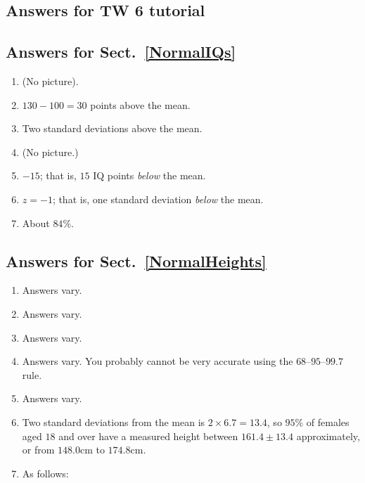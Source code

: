 \documentclass[
  11pt,
  a4paper,
  krantz2]{krantz}
\providecommand{\tightlist}{%
  \setlength{\itemsep}{0pt}\setlength{\parskip}{0pt}}
\begin{document}
\begin{footnotesize}
\section{Answers for TW 6 tutorial}\label{Lecture6Answers}

\subsection*{Answers for Sect.~\ref{NormalIQs}}\label{answers-for-sect.-refnormaliqs}

\begin{enumerate}
\def\labelenumi{\arabic{enumi}.}
\tightlist
\item
  (No picture).
\item
  \(130 - 100 = 30\) points above the mean.
\item
  Two standard deviations above the mean.
\item
  (No picture.)
\item
  \(-15\); that is, \(15\) IQ points \emph{below} the mean.
\item
  \(z = -1\); that is, one standard deviation \emph{below} the mean.
\item
  About \(84\)\%.
\end{enumerate}

\subsection*{Answers for Sect.~\ref{NormalHeights}}\label{answers-for-sect.-refnormalheights}

\begin{enumerate}
\def\labelenumi{\arabic{enumi}.}
\tightlist
\item
  Answers vary.
\item
  Answers vary.
\item
  Answers vary.
\item
  Answers vary.
  You probably cannot be very accurate using the \(68\)--\(95\)--\(99.7\) rule.
\item
  Answers vary.
\item
  Two standard deviations from the mean is \(2\times 6.7 = 13.4\), so \(95\)\% of females aged \(18\) and over have a measured height
  between \(161.4 \pm13.4\) approximately, or from \(148.0\)cm to \(174.8\)cm.
\item
  As follows:


\end{enumerate}
\end{footnotesize}
\end{document}
